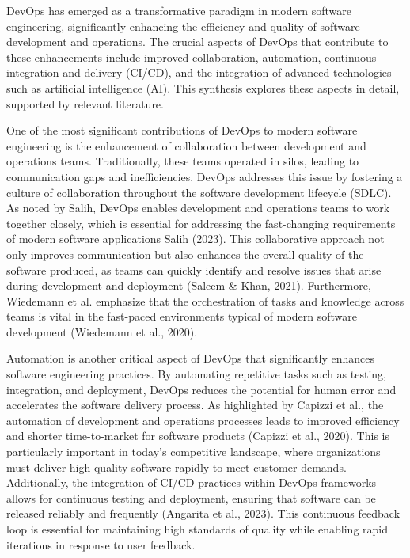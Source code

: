 DevOps has emerged as a transformative paradigm in modern software engineering, significantly enhancing the efficiency and quality of software development and operations. The crucial aspects of DevOps that contribute to these enhancements include improved collaboration, automation, continuous integration and delivery (CI/CD), and the integration of advanced technologies such as artificial intelligence (AI). This synthesis explores these aspects in detail, supported by relevant literature.

One of the most significant contributions of DevOps to modern software engineering is the enhancement of collaboration between development and operations teams. Traditionally, these teams operated in silos, leading to communication gaps and inefficiencies. DevOps addresses this issue by fostering a culture of collaboration throughout the software development lifecycle (SDLC). As noted by Salih, DevOps enables development and operations teams to work together closely, which is essential for addressing the fast-changing requirements of modern software applications Salih (2023). This collaborative approach not only improves communication but also enhances the overall quality of the software produced, as teams can quickly identify and resolve issues that arise during development and deployment (Saleem & Khan, 2021). Furthermore, Wiedemann et al. emphasize that the orchestration of tasks and knowledge across teams is vital in the fast-paced environments typical of modern software development (Wiedemann et al., 2020).

Automation is another critical aspect of DevOps that significantly enhances software engineering practices. By automating repetitive tasks such as testing, integration, and deployment, DevOps reduces the potential for human error and accelerates the software delivery process. As highlighted by Capizzi et al., the automation of development and operations processes leads to improved efficiency and shorter time-to-market for software products (Capizzi et al., 2020). This is particularly important in today's competitive landscape, where organizations must deliver high-quality software rapidly to meet customer demands. Additionally, the integration of CI/CD practices within DevOps frameworks allows for continuous testing and deployment, ensuring that software can be released reliably and frequently (Angarita et al., 2023). This continuous feedback loop is essential for maintaining high standards of quality while enabling rapid iterations in response to user feedback.

